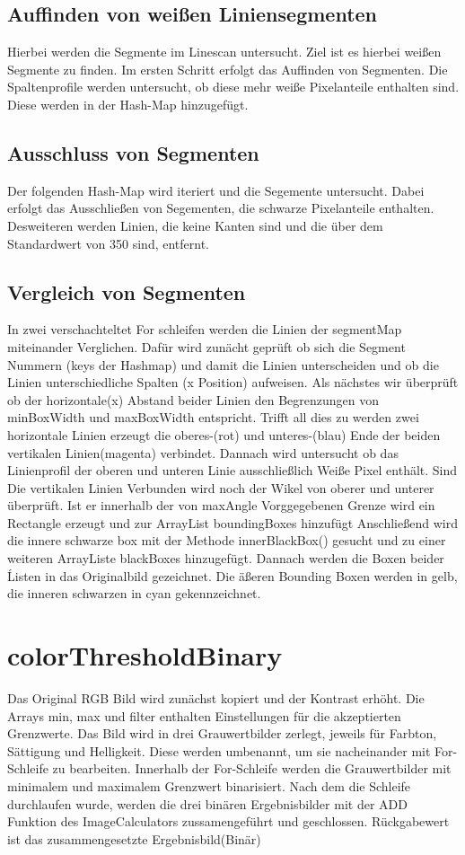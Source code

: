 \documentclass[a4paper,11pt,parskip]{article}
\begin{document}
\subsection{Auffinden von weißen Liniensegmenten}
Hierbei werden die Segmente im Linescan untersucht. Ziel ist es hierbei weißen Segmente zu finden. Im ersten Schritt erfolgt das Auffinden von Segmenten. Die Spaltenprofile werden untersucht, ob diese mehr weiße Pixelanteile enthalten sind. Diese werden in der Hash-Map hinzugefügt.\\

\subsection{Ausschluss von Segmenten}
Der folgenden Hash-Map wird iteriert und die Segemente untersucht. Dabei erfolgt das Ausschließen von Segementen, die schwarze Pixelanteile enthalten. Desweiteren werden Linien, die keine Kanten sind und die über dem Standardwert von 350 sind, entfernt. 

\subsection{Vergleich von Segmenten}
In zwei verschachteltet For schleifen werden die Linien der segmentMap miteinander Verglichen. 
Dafür wird zunächt geprüft ob sich die Segment Nummern (keys der Hashmap) und damit die Linien unterscheiden und ob die Linien unterschiedliche Spalten (x Position) aufweisen. 
Als nächstes wir überprüft ob der horizontale(x) Abstand beider Linien den Begrenzungen von minBoxWidth und maxBoxWidth entspricht.
Trifft all dies zu werden zwei horizontale Linien erzeugt die oberes-(rot) und unteres-(blau) Ende der beiden vertikalen Linien(magenta) verbindet. 
Dannach wird untersucht ob das Linienprofil der oberen  und unteren Linie ausschließlich Weiße Pixel enthält.
Sind Die vertikalen Linien Verbunden wird noch der Wikel von oberer und unterer überprüft. Ist er innerhalb der von maxAngle Vorggegebenen Grenze wird ein Rectangle erzeugt und zur ArrayList boundingBoxes hinzufügt
Anschließend wird die innere schwarze box mit der Methode innerBlackBox() gesucht und zu einer weiteren ArrayListe blackBoxes hinzugefügt. Dannach werden die Boxen beider Ĺisten in das Originalbild gezeichnet. Die äßeren Bounding Boxen werden in gelb, die inneren schwarzen in cyan gekennzeichnet.

\section{colorThresholdBinary}
Das Original RGB Bild wird zunächst kopiert und der Kontrast erhöht. Die Arrays min, max und filter enthalten Einstellungen für die akzeptierten Grenzwerte. Das Bild wird in drei Grauwertbilder zerlegt, jeweils für Farbton, Sättigung und Helligkeit. Diese werden umbenannt, um sie nacheinander mit For-Schleife zu bearbeiten. Innerhalb der For-Schleife werden die Grauwertbilder mit minimalem und maximalem Grenzwert binarisiert. Nach dem die Schleife durchlaufen wurde, werden die drei binären Ergebnisbilder mit der ADD Funktion des ImageCalculators zussamengeführt und geschlossen. Rückgabewert ist das zusammengesetzte Ergebnisbild(Binär)
\end{document}
